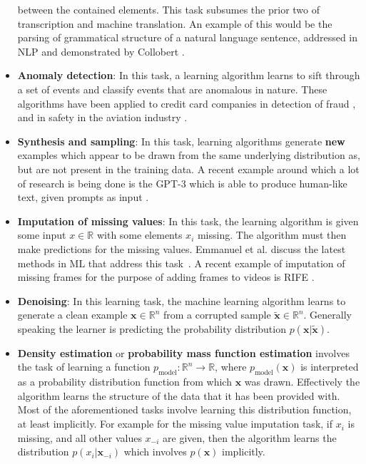 \begin{itemize}
    between the contained elements. This task subsumes the prior two of
    transcription and machine translation. An example of this would be the
    parsing of grammatical structure of a natural language sentence,
    addressed in \gls{NLP} and demonstrated by Collobert
    \cite{pmlr-v15-collobert11a}.
    \item \textbf{Anomaly detection}: In this task, a learning algorithm learns
    to sift through a set of events and classify events that are anomalous
    in nature. These algorithms have been applied to credit card companies
    in detection of fraud \cite{DBLP:journals/corr/abs-2108-10005}, and in
    safety in the aviation industry \cite{Janakiraman2016, Basora2019}.
    \item \textbf{Synthesis and sampling}: In this task, learning algorithms
    generate \textbf{new} examples which appear to be drawn from the same
    underlying distribution as, but are not present in the training data.
    A recent example around which a lot of research is being done is the
    \gls{GPT-3} which is able to produce human-like text, given prompts as
    input \cite{DBLP:journals/corr/abs-2005-14165}.
    \item \textbf{Imputation of missing values}: In this task, the learning
    algorithm is given some input $x\in\mathbb{R}$ with some elements
    $x_i$ missing. The algorithm must then make predictions for the
    missing values. Emmanuel et al. discuss the latest methods in
    \gls{ML} that address this task~\cite{Emmanuel2021}. A recent example of
    imputation of missing frames for the purpose of adding frames to videos
    is \gls{RIFE} \cite{huang2020rife}.
    \item \textbf{Denoising}: In this learning task, the machine learning
    algorithm learns to generate a clean example $\mathbf{x}\in\mathbb{R}^n$
    from a corrupted sample $\tilde{\mathbf{x}}\in\mathbb{R}^n$. Generally
    speaking the learner is predicting the probability distribution
    $p(\mathbf{x}|\tilde{\mathbf{x}})$.
    \item \textbf{Density estimation} or \textbf{probability mass function estimation}
    involves the task of learning a function $p_\text{model}:\mathbb{R}^n\rightarrow{}\mathbb{R}$,
    where $p_\text{model}(\mathbf{x})$ is interpreted as a probability distribution function
    from which $\mathbf{x}$ was drawn. Effectively the algorithm learns the
    structure of the data that it has been provided with. Most of the
    aforementioned tasks involve learning this distribution function, at least
    implicitly. For example for the missing value imputation task, if $x_i$ is
    missing, and all other values $x_{-i}$ are given, then the algorithm learns
    the distribution $p(x_i|\mathbf{x}_{-i})$ which involves $p(\mathbf{x})$
    implicitly.
\end{itemize}
